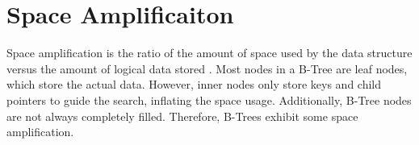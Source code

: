 \section{Space Amplificaiton}
Space amplification is the ratio of the amount of space used by the data structure versus the amount of logical data stored \cite{kuszmaul2014fractal}.
Most nodes in a B-Tree are leaf nodes, which store the actual data.
However, inner nodes only store keys and child pointers to guide the search, inflating the space usage.
Additionally, B-Tree nodes are not always completely filled.
Therefore, B-Trees exhibit some space amplification.